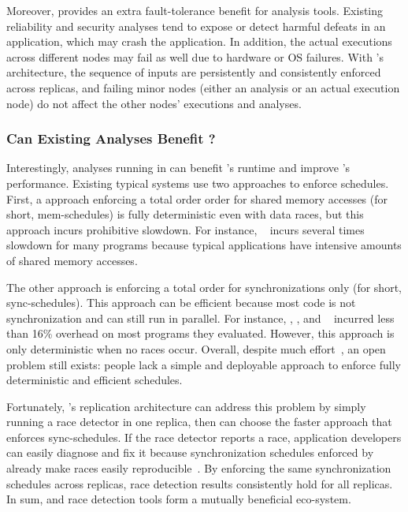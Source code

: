 Moreover, \xxx provides an extra fault-tolerance benefit for analysis tools. 
Existing reliability and security analyses tend to expose or detect harmful 
defeats in an application, which may crash the application. In addition, the 
actual executions across different nodes may fail as well due to hardware or OS 
failures. With \xxx's \smr architecture, the sequence of inputs are 
persistently and consistently enforced across replicas, and failing minor 
nodes (either an analysis or an actual execution node) do not affect the other 
nodes' executions and analyses.

% 

\subsubsection{Can Existing Analyses Benefit \xxx?} 
\label{sec:strengthen-crane}

Interestingly, analyses running in \xxx can benefit \xxx's \dmt runtime and 
improve \xxx's performance. Existing typical \dmt systems use two approaches to 
enforce schedules. First, a \dmt approach enforcing a total order order for 
shared memory accesses (for short, mem-schedules) is fully deterministic even 
with data races, but this approach incurs prohibitive slowdown. For instance, 
\dthreads~\cite{dthreads:sosp11} incurs several times slowdown for many 
programs because typical applications have intensive amounts of shared memory 
accesses.

The other \dmt approach is enforcing a total order for 
synchronizations only (for short, sync-schedules). This approach can be 
efficient because most code is not synchronization and can still run in 
parallel. For instance, \kendo, \tern, and \peregrine~\cite{kendo:asplos09, 
cui:tern:osdi10, parrot:sosp13} incurred less than 16\% overhead on most 
programs they evaluated. However, this approach is only deterministic when 
no races occur. Overall, despite much effort~\cite{dthreads:sosp11, 
parrot:sosp13, peregrine:sosp11, determinator:osdi10}, an open problem still 
exists: people lack a simple and deployable approach to enforce fully 
deterministic and efficient \dmt schedules.


Fortunately, \xxx's replication architecture can address this problem by simply
running a race detector in one replica, then \xxx can choose the faster \dmt 
approach that enforces sync-schedules. If the race detector reports a race, 
application developers can easily diagnose and fix it because synchronization 
schedules enforced by \dmt already make races easily 
reproducible~\cite{pres:sosp09}. By enforcing the same synchronization 
schedules across replicas, race detection results consistently hold for all 
replicas. In sum, \xxx and race detection tools form a mutually beneficial 
eco-system.
